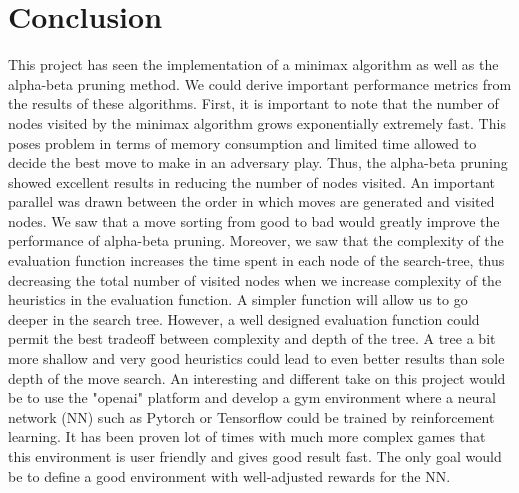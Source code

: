 \documentclass{article}
\begin{document}

\section{Conclusion}
This project has seen the implementation of a minimax algorithm as well as the alpha-beta pruning method. We could derive important performance metrics from the results of these algorithms. First, it is important to note that the number of nodes visited by the minimax algorithm grows exponentially extremely fast. This poses problem in terms of memory consumption and limited time allowed to decide the best move to make in an adversary play. Thus, the alpha-beta pruning showed excellent results in reducing the number of nodes visited. 
An important parallel was drawn between the order in which moves are generated and visited nodes. We saw that a move sorting from good to bad would greatly improve the performance of alpha-beta pruning. 
Moreover, we saw that the complexity of the evaluation function increases the time spent in each node of the search-tree, thus decreasing the total number of visited nodes when we increase complexity of the heuristics in the evaluation function. A simpler function will allow us to go deeper in the search tree. However, a well designed evaluation function could permit the best tradeoff between complexity and depth of the tree. A tree a bit more shallow and very good heuristics could lead to even better results than sole depth of the move search.
An interesting and different take on this project would be to use the "openai" platform and develop a gym environment where a neural network (NN) such as Pytorch or Tensorflow could be trained by reinforcement learning. It has been proven lot of times with much more complex games that this environment is user friendly and gives good result fast. The only goal would be to define a good environment with well-adjusted rewards for the NN.
\end{document}
